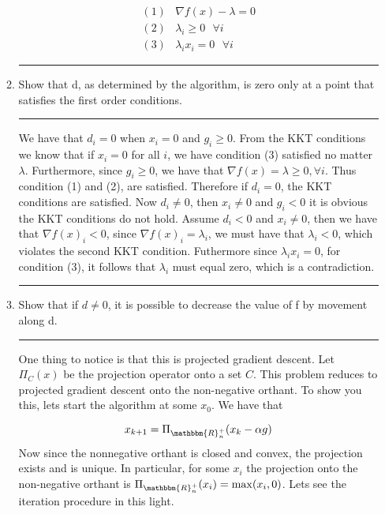 \documentclass{article} %
\newcommand{\R}{\mathbbm{R}}
\begin{document}
\begin{enumerate}
\begin{enumerate}
\begin{equation*}
\begin{aligned}
(1) & \nabla f(x) -  \lambda = 0 \\ 
(2) & \lambda_i  \geq 0 \mbox{    } \forall i \\ 
(3) & \lambda_i x_i = 0 \mbox{   } \forall i 
\end{aligned}
\end{equation*}

\rule{\textwidth}{1pt}


\item Show that d, as determined by the algorithm, is zero only at a point that satisfies the first order conditions. 
\rule{\textwidth}{1pt}



We have that $d_i = 0$ when $x_i = 0$ and $g_i \geq 0$. From the KKT conditions we know that if $x_i = 0$ for all $i$, we have condition (3) satisfied no matter $\lambda$. Furthermore, since $g_i \geq 0$, we have that $\nabla f(x) = \lambda  \geq 0, \forall i$. Thus condition (1) and (2), are satisfied. Therefore if $d_i = 0$, the KKT conditions are satisfied.  Now $d_i \neq 0$, then  $x_i \neq 0$ and $g_i < 0$ it is obvious the KKT conditions do not hold. Assume $d_i < 0$ and $x_i \neq 0$, then we have that $\nabla f(x)_i < 0$, since $\nabla f(x)_i = \lambda_i$, we must have that $\lambda_i < 0$, which violates the second KKT condition. Futhermore since $\lambda_i x_i = 0$, for condition (3), it follows that $\lambda_i$ must equal zero, which is a contradiction. 

\rule{\textwidth}{1pt}



\item Show that if $d \neq 0$, it is possible to decrease the value of f by movement along d. 

\rule{\textwidth}{1pt}

One thing to notice is that this is projected gradient descent. Let $\Pi_{C}(x) $ be the projection operator onto a set $C$. This problem reduces to projected gradient descent onto the non-negative orthant. To show you this, lets start the algorithm at some $x_0$. We have that

\[
x_{k+1}= \Pi_{\R_n^{+}}(x_k - \alpha g)
\]
Now since the nonnegative orthant is closed and convex, the projection exists and is unique. In particular, for some $x_i$ the projection onto the non-negative orthant is $ \Pi_{\R_n^{+}}(x_i) = \max(x_i, 0)$. Lets see the iteration procedure in this light.


\end{enumerate}
\end{enumerate}
\end{document}
